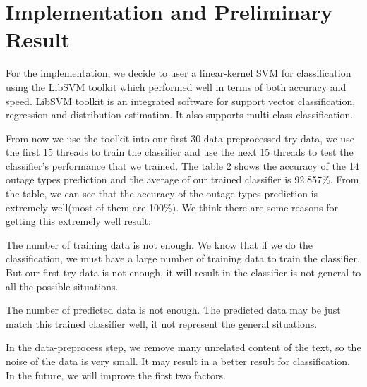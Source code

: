 \documentclass{sig-alternate}
\begin{document}
\section{Implementation and Preliminary Result}
For the implementation, we decide to user a linear-kernel SVM for classification using the LibSVM toolkit which performed well in terms of both accuracy and speed. LibSVM toolkit is an integrated software for support vector classification, regression and distribution estimation. It also supports multi-class classification. 
\par From now we use the toolkit into our first 30 data-preprocessed try data, we use the first 15 threads to train the classifier and use the next 15 threads to test the classifier’s performance that we trained. The table 2 shows the accuracy of the 14 outage types prediction and the average of our trained classifier is 92.857\%. From the table, we can see that the accuracy of the outage types prediction is extremely well(most of them are 100\%). We think there are some reasons for getting this extremely well result:
\par The number of training data is not enough. We know that if we do the classification, we must have a large number of training data to train the classifier. But our first try-data is not enough, it will result in the classifier is not general to all the possible situations.
\par The number of predicted data is not enough. The predicted data may be just match this trained classifier well, it not represent the general situations.
\par In the data-preprocess step, we remove many unrelated content of the text, so the noise of the data is very small. It may result in a better result for classification.
In the future, we will improve the first two factors.
\end{document}
